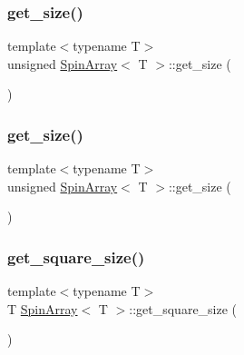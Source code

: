 \mbox{\label{classSpinArray_ae7aa5d361c1f3024506291b04e027a7a}} 
\subsubsection{\texorpdfstring{get\+\_\+size()}{get\_size()}\hspace{0.1cm}{\footnotesize\ttfamily [3/4]}}
{\footnotesize\ttfamily template$<$typename T$>$ \\
unsigned \mbox{\hyperlink{classSpinArray}{Spin\+Array}}$<$ T $>$\+::get\+\_\+size (\begin{DoxyParamCaption}{ }\end{DoxyParamCaption})\hspace{0.3cm}{\ttfamily [inline]}}

\mbox{\label{classSpinArray_ae7aa5d361c1f3024506291b04e027a7a}} 
\subsubsection{\texorpdfstring{get\+\_\+size()}{get\_size()}\hspace{0.1cm}{\footnotesize\ttfamily [4/4]}}
{\footnotesize\ttfamily template$<$typename T$>$ \\
unsigned \mbox{\hyperlink{classSpinArray}{Spin\+Array}}$<$ T $>$\+::get\+\_\+size (\begin{DoxyParamCaption}{ }\end{DoxyParamCaption})\hspace{0.3cm}{\ttfamily [inline]}}

\mbox{\label{classSpinArray_adf314e4c6182e5344e8b793784576677}} 
\subsubsection{\texorpdfstring{get\+\_\+square\+\_\+size()}{get\_square\_size()}\hspace{0.1cm}{\footnotesize\ttfamily [1/4]}}
{\footnotesize\ttfamily template$<$typename T$>$ \\
T \mbox{\hyperlink{classSpinArray}{Spin\+Array}}$<$ T $>$\+::get\+\_\+square\+\_\+size (\begin{DoxyParamCaption}{ }\end{DoxyParamCaption})\hspace{0.3cm}{\ttfamily [inline]}}

